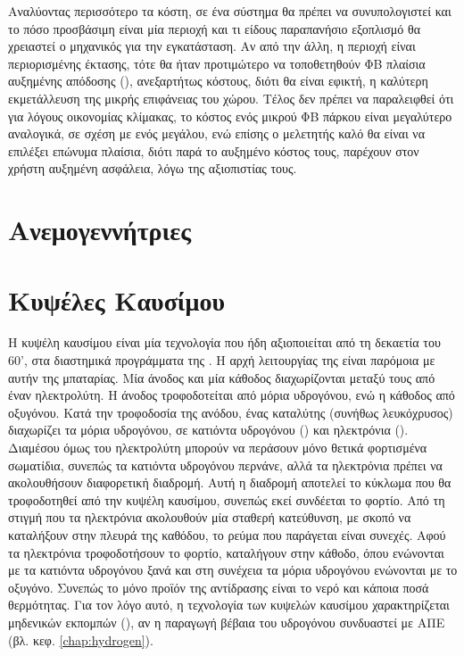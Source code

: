 \documentclass[12pt]{report}
\begin{document}
Αναλύοντας περισσότερο τα κόστη, σε ένα σύστημα θα πρέπει να συνυπολογιστεί και το πόσο προσβάσιμη είναι μία περιοχή και τι είδους παραπανήσιο εξοπλισμό θα χρειαστεί ο μηχανικός για την εγκατάσταση. 
Αν από την άλλη, η περιοχή είναι περιορισμένης έκτασης, τότε θα ήταν προτιμώτερο να τοποθετηθούν ΦΒ πλαίσια αυξημένης απόδοσης ({}), ανεξαρτήτως κόστους, διότι θα είναι εφικτή, η καλύτερη εκμετάλλευση 
της μικρής επιφάνειας του χώρου. Τέλος δεν
πρέπει να παραλειφθεί ότι για λόγους οικονομίας κλίμακας, το κόστος ενός μικρού ΦΒ πάρκου είναι μεγαλύτερο αναλογικά, σε σχέση με ενός μεγάλου, ενώ επίσης ο μελετητής καλό θα είναι να επιλέξει επώνυμα πλαίσια, 
διότι παρά το αυξημένο κόστος τους, παρέχουν στον χρήστη αυξημένη ασφάλεια, λόγω της αξιοπιστίας τους. 
\section{Ανεμογεννήτριες}
\section{Κυψέλες Καυσίμου}
Η κυψέλη καυσίμου είναι μία τεχνολογία που ήδη αξιοποιείται από τη δεκαετία του 60', στα διαστημικά προγράμματα της {}. Η αρχή λειτουργίας της είναι παρόμοια με αυτήν της μπαταρίας. Μία άνοδος και μία κάθοδος
διαχωρίζονται μεταξύ τους από έναν ηλεκτρολύτη. Η άνοδος τροφοδοτείται από μόρια υδρογόνου, ενώ η κάθοδος από οξυγόνου. Κατά την τροφοδοσία της ανόδου, ένας καταλύτης (συνήθως λευκόχρυσος) διαχωρίζει τα μόρια υδρογόνου, 
σε κατιόντα υδρογόνου ({}) και ηλεκτρόνια ({}).
Διαμέσου όμως του ηλεκτρολύτη μπορούν να περάσουν μόνο θετικά φορτισμένα σωματίδια, συνεπώς τα κατιόντα υδρογόνου περνάνε, αλλά τα ηλεκτρόνια πρέπει να ακολουθήσουν διαφορετική διαδρομή. Αυτή η διαδρομή αποτελεί
το κύκλωμα που θα τροφοδοτηθεί από την κυψέλη καυσίμου, συνεπώς εκεί συνδέεται το φορτίο. Από τη στιγμή που τα ηλεκτρόνια ακολουθούν μία σταθερή κατεύθυνση, με σκοπό να καταλήξουν στην πλευρά της καθόδου, το ρεύμα που 
παράγεται είναι συνεχές. Αφού τα ηλεκτρόνια τροφοδοτήσουν το φορτίο, καταλήγουν στην κάθοδο, όπου ενώνονται με τα κατιόντα υδρογόνου ξανά και στη συνέχεια τα μόρια υδρογόνου ενώνονται με το οξυγόνο. 
Συνεπώς το μόνο προϊόν της αντίδρασης είναι το νερό και κάποια ποσά θερμότητας. Για τον λόγο αυτό, η
τεχνολογία των κυψελών καυσίμου χαρακτηρίζεται μηδενικών εκπομπών ({}), αν η παραγωγή βέβαια του υδρογόνου συνδυαστεί με ΑΠΕ (βλ. κεφ. \ref{chap:hydrogen}).
\end{document}

